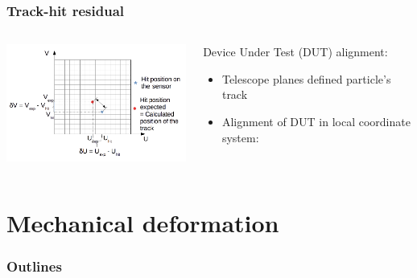 \documentclass{beamer}
\begin{document}
\begin{frame}
    \frametitle{Track-hit residual}

    \begin{columns}[t]
      \begin{column}{7cm}
        \begin{center}
          \includegraphics[width = 7cm]{Pictures/residual_explanation.png}
        \end{center}
      \end{column}
      \begin{column}{4cm}
        \scriptsize{
        \begin{block}{Device Under Test (DUT) alignment:}
          \begin{itemize}
            \item Telescope planes defined particle's track
            \item Alignment of DUT in local coordinate system:
          \end{itemize}
        \end{block}
      }
      \end{column}
    \end{columns}
\end{frame}

  \section{Mechanical deformation}
  
\begin{frame}
    \frametitle{Outlines}
    \tableofcontents[currentsection,hideothersubsections, 
    sectionstyle=show/shaded]
\end{frame}
\end{document}
